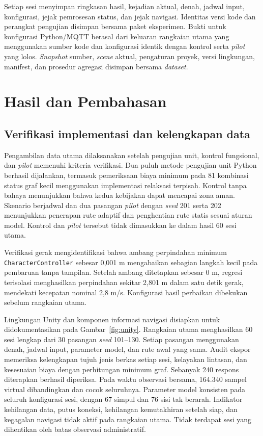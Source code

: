 \documentclass[10pt,a4paper]{article}
\begin{document}
Setiap sesi menyimpan ringkasan hasil, kejadian aktual, denah, jadwal input, konfigurasi, jejak pemrosesan status, dan jejak navigasi. Identitas versi kode dan perangkat pengujian disimpan bersama paket eksperimen. Bukti untuk konfigurasi Python/MQTT berasal dari keluaran rangkaian utama yang menggunakan sumber kode dan konfigurasi identik dengan kontrol serta \emph{pilot} yang lolos. \emph{Snapshot} sumber, \emph{scene} aktual, pengaturan proyek, versi lingkungan, manifest, dan prosedur agregasi disimpan bersama \emph{dataset}.

\FloatBarrier
\section*{Hasil dan Pembahasan}
\subsection*{Verifikasi implementasi dan kelengkapan data}
Pengambilan data utama dilaksanakan setelah pengujian unit, kontrol fungsional, dan \emph{pilot} memenuhi kriteria verifikasi. Dua puluh metode pengujian unit Python berhasil dijalankan, termasuk pemeriksaan biaya minimum pada 81 kombinasi status graf kecil menggunakan implementasi relaksasi terpisah. Kontrol tanpa bahaya menunjukkan bahwa kedua kebijakan dapat mencapai zona aman. Skenario berjadwal dan dua pasangan \emph{pilot} dengan \emph{seed} 201 serta 202 menunjukkan penerapan rute adaptif dan penghentian rute statis sesuai aturan model. Kontrol dan \emph{pilot} tersebut tidak dimasukkan ke dalam hasil 60 sesi utama.

Verifikasi gerak mengidentifikasi bahwa ambang perpindahan minimum \texttt{CharacterController} sebesar 0,001 m mengabaikan sebagian langkah kecil pada pembaruan tanpa tampilan. Setelah ambang ditetapkan sebesar 0 m, regresi terisolasi menghasilkan perpindahan sekitar 2,801 m dalam satu detik gerak, mendekati kecepatan nominal 2,8 m/s. Konfigurasi hasil perbaikan dibekukan sebelum rangkaian utama.

Lingkungan Unity dan komponen informasi navigasi disiapkan untuk didokumentasikan pada Gambar~\ref{fig:unity}. Rangkaian utama menghasilkan 60 sesi lengkap dari 30 pasangan \emph{seed} 101--130. Setiap pasangan menggunakan denah, jadwal input, parameter model, dan rute awal yang sama. Audit ekspor memeriksa kelengkapan tujuh jenis berkas setiap sesi, kelayakan lintasan, dan kesesuaian biaya dengan perhitungan minimum graf. Sebanyak 240 respons diterapkan berhasil diperiksa. Pada waktu observasi bersama, 164.340 sampel virtual dibandingkan dan cocok seluruhnya. Parameter model konsisten pada seluruh konfigurasi sesi, dengan 67 simpul dan 76 sisi tak berarah. Indikator kehilangan data, putus koneksi, kehilangan kemutakhiran setelah siap, dan kegagalan navigasi tidak aktif pada rangkaian utama. Tidak terdapat sesi yang dihentikan oleh batas observasi administratif.
\end{document}
